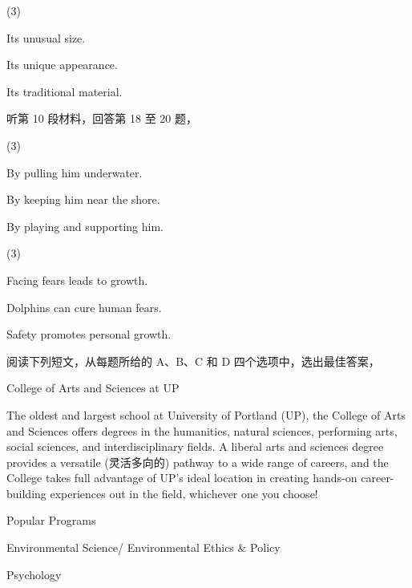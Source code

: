 \documentclass{英语试卷}
\begin{document}
\begin{choices}(3)
  \item Its unusual size.
  \item Its unique appearance.
  \item Its traditional material.
\end{choices}
\par 听第 10 段材料，回答第 18 至 20 题，\par
{}
\begin{choices}(3)
  \item By pulling him underwater.
  \item By keeping him near the shore.
  \item By playing and supporting him.
\end{choices}
\begin{choices}(3)
  \item Facing fears leads to growth.
  \item Dolphins can cure human fears.
  \item Safety promotes personal growth.
\end{choices}
\par 阅读下列短文，从每题所给的 A、B、C 和 D 四个选项中，选出最佳答案，\par
{}
\par College of Arts and Sciences at UP\par
\par The oldest and largest school at University of Portland (UP), the College of Arts and Sciences offers degrees in the humanities, natural sciences, performing arts, social sciences, and interdisciplinary fields. A liberal arts and sciences degree provides a versatile (灵活多向的) pathway to a wide range of careers, and the College takes full advantage of UP's ideal location in creating hands-on career-building experiences out in the field, whichever one you choose!\par
\par Popular Programs\par
\par Environmental Science/ Environmental Ethics \& Policy\par
\par Psychology\par
\end{document}
